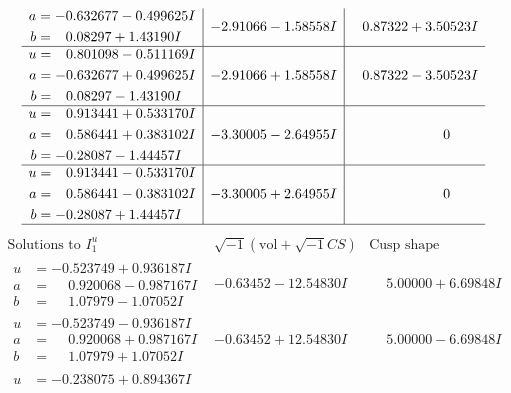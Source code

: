 \documentclass[1p]{elsarticle_modified}
\theoremstyle{definition}
\newcommand{\I}{\sqrt{-1}}
\begin{document}
$$\begin{array}{c|c|c}
\begin{aligned}
a &= -0.632677 - 0.499625 I \\
b &= \phantom{-}0.08297 + 1.43190 I\end{aligned}
 & -2.91066 - 1.58558 I & \phantom{-}0.87322 + 3.50523 I \\ \hline\begin{aligned}
u &= \phantom{-}0.801098 - 0.511169 I \\
a &= -0.632677 + 0.499625 I \\
b &= \phantom{-}0.08297 - 1.43190 I\end{aligned}
 & -2.91066 + 1.58558 I & \phantom{-}0.87322 - 3.50523 I \\ \hline\begin{aligned}
u &= \phantom{-}0.913441 + 0.533170 I \\
a &= \phantom{-}0.586441 + 0.383102 I \\
b &= -0.28087 - 1.44457 I\end{aligned}
 & -3.30005 - 2.64955 I & \phantom{-0.000000 } 0 \\ \hline\begin{aligned}
u &= \phantom{-}0.913441 - 0.533170 I \\
a &= \phantom{-}0.586441 - 0.383102 I \\
b &= -0.28087 + 1.44457 I\end{aligned}
 & -3.30005 + 2.64955 I & \phantom{-0.000000 } 0\\
 \hline 
 \end{array}$$\newpage$$\begin{array}{c|c|c}  
\text{Solutions to }I^u_{1}& \I (\text{vol} + \sqrt{-1}CS) & \text{Cusp shape}\\
 \hline 
\begin{aligned}
u &= -0.523749 + 0.936187 I \\
a &= \phantom{-}0.920068 - 0.987167 I \\
b &= \phantom{-}1.07979 - 1.07052 I\end{aligned}
 & -0.63452 - 12.54830 I & \phantom{-}5.00000 + 6.69848 I \\ \hline\begin{aligned}
u &= -0.523749 - 0.936187 I \\
a &= \phantom{-}0.920068 + 0.987167 I \\
b &= \phantom{-}1.07979 + 1.07052 I\end{aligned}
 & -0.63452 + 12.54830 I & \phantom{-}5.00000 - 6.69848 I \\ \hline\begin{aligned}
u &= -0.238075 + 0.894367 I \\

\end{aligned}
\end{array}$$
\end{document}
